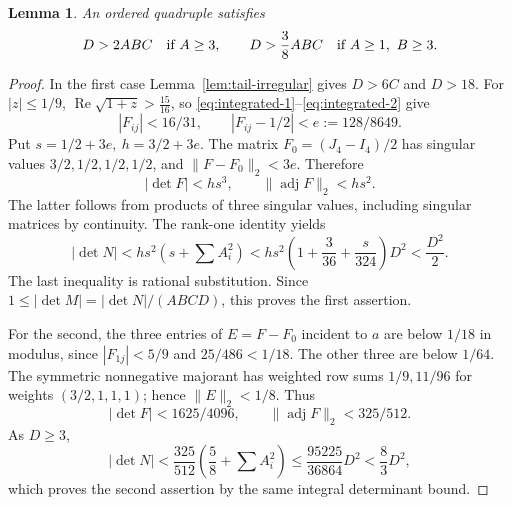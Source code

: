 \documentclass[12pt]{article}
\newtheorem{lemma}[theorem]{Lemma}
\numberwithin{equation}{section}
\begin{document}
\begin{lemma}\label{lem:product-four}
An ordered quadruple satisfies
\[
 D>2ABC\quad\hbox{if }A\ge3,\qquad
 D>\frac38ABC\quad\hbox{if }A\ge1,\ B\ge3.
\]
\end{lemma}
\begin{proof}
In the first case Lemma~\ref{lem:tail-irregular} gives \(D>6C\) and
\(D>18\). For \(|z|\le1/9\),
\(\operatorname{Re}\sqrt{1+z}>\frac{15}{16}\), so \eqref{eq:integrated-1}--\eqref{eq:integrated-2} give
\[
 |F_{ij}|<16/31,\qquad |F_{ij}-1/2|<e:=128/8649.
\]
Put \(s=1/2+3e,\ h=3/2+3e\). The matrix \(F_0=(J_4-I_4)/2\)
has singular values \(3/2,1/2,1/2,1/2\), and
\(\|F-F_0\|_2<3e\). Therefore
\[
 |\det F|<hs^3,\qquad \|\operatorname{adj}F\|_2<hs^2.
\]
The latter follows from products of three singular values, including
singular matrices by continuity. The rank-one identity yields
\[
 |\det N|<hs^2\left(s+\sum A_i^2\right)
 <hs^2\left(1+\frac3{36}+\frac{s}{324}\right)D^2<\frac{D^2}{2}.
\]
The last inequality is rational substitution. Since
\(1\le|\det M|=|\det N|/(ABCD)\), this proves the first assertion.

For the second, the three entries of \(E=F-F_0\) incident to \(a\)
are below \(1/18\) in modulus, since \(|F_{1j}|<5/9\) and
\(25/486<1/18\). The other three are below \(1/64\).
The symmetric nonnegative majorant has weighted row sums \(1/9,11/96\)
for weights \((3/2,1,1,1)\); hence \(\|E\|_2<1/8\).
Thus
\[
 |\det F|<1625/4096,\qquad
 \|\operatorname{adj}F\|_2<325/512.
\]
As \(D\ge3\),
\[
 |\det N|<
 \frac{325}{512}\left(\frac58+\sum A_i^2\right)
 \le\frac{95225}{36864}D^2<\frac83D^2,
\]
which proves the second assertion by the same integral determinant bound.
\end{proof}
\end{document}
